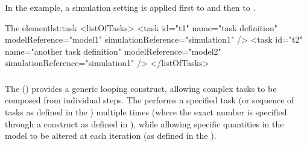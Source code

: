 In the example, a simulation setting  is applied first to  and then to .
\begin{myXmlLst}{The  element}{lst:task}
<listOfTasks>
	<task id="t1" name="task definition" modelReference="model1" 
		simulationReference="simulation1" />
	<task id="t2" name="another task definition" modelReference="model2" 
		simulationReference="simulation1" />
</listOfTasks>
\end{myXmlLst}


\begin{blockChanged}



\end{blockChanged}

\subsubsection{}
\label{class:repeatedTask}
The  () provides a generic looping construct, allowing complex tasks to be composed from individual steps. The  performs a specified task (or sequence of tasks as defined in the \hyperref[class:listOfSubTasks]{}) multiple times (where the exact number is specified through a \Range construct as defined in \hyperref[sec:rangeAttribute]{}), while allowing specific quantities in the model  to be altered at each iteration (as defined in the \hyperref[sec:changesRepeatedTask]{}).

